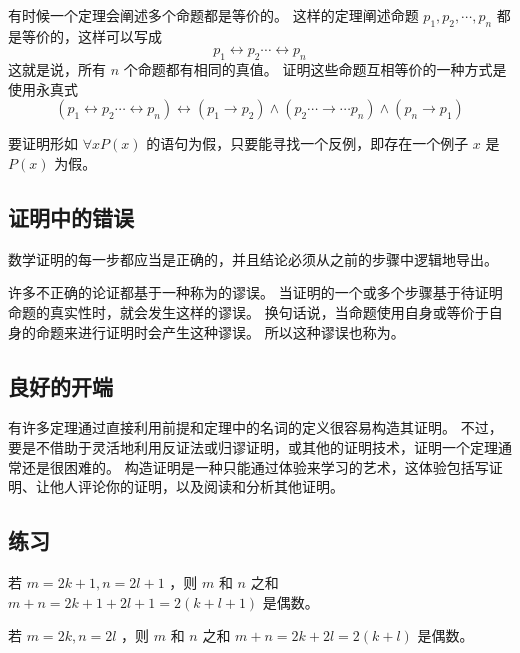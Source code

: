 {{{            有时候一个定理会阐述多个命题都是等价的。
            这样的定理阐述命题 $p_1, p_2, \cdots , p_n$ 都是等价的，这样可以写成
            $$p_1 \leftrightarrow p_2 \cdots \leftrightarrow p_n$$
            这就是说，所有 $n$ 个命题都有相同的真值。
            证明这些命题互相等价的一种方式是使用永真式
            $$(p_1 \leftrightarrow p_2 \cdots \leftrightarrow p_n) \leftrightarrow (p_1 \rightarrow p_2) \wedge (p_2 \cdots \rightarrow \cdots p_n) \wedge (p_n \rightarrow p_1)$$
        }

        {
            要证明形如 $\forall x P(x)$ 的语句为假，只要能寻找一个反例，即存在一个例子 $x$ 是 $P(x)$ 为假。
        }
    }

    \subsection{证明中的错误}
    {
        数学证明的每一步都应当是正确的，并且结论必须从之前的步骤中逻辑地导出。

        许多不正确的论证都基于一种称为的谬误。
        当证明的一个或多个步骤基于待证明命题的真实性时，就会发生这样的谬误。
        换句话说，当命题使用自身或等价于自身的命题来进行证明时会产生这种谬误。
        所以这种谬误也称为。

    }

    \subsection{良好的开端}
    {
        有许多定理通过直接利用前提和定理中的名词的定义很容易构造其证明。
        不过，要是不借助于灵活地利用反证法或归谬证明，或其他的证明技术，证明一个定理通常还是很困难的。
        构造证明是一种只能通过体验来学习的艺术，这体验包括写证明、让他人评论你的证明，以及阅读和分析其他证明。
    }

    \subsection{练习}
    {
        \begin{practices}
            若 $m = 2k + 1, n = 2l + 1$ ，则 $m$ 和 $n$ 之和 $m + n = 2k + 1 + 2l + 1 = 2(k + l + 1)$ 是偶数。
        \end{practices}

        \begin{practices}
            若 $m = 2k, n = 2l$ ，则 $m$ 和 $n$ 之和 $m + n = 2k + 2l = 2(k + l)$ 是偶数。
        \end{practices}

}}
